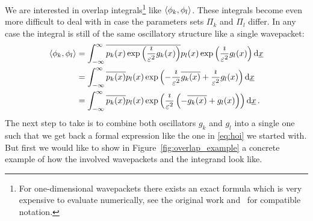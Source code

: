 \documentclass[a4paper,10pt]{article}
\begin{document}
We are interested in overlap integrals\footnote{For one-dimensional wavepackets there
exists an exact formula which is very expensive to evaluate numerically, see the original work
\cite{H_R_quantization_rules} and~\cite{B_bachelor_thesis} for compatible notation.} like
$\left\langle \phi_k , \phi_l \right\rangle$. These integrals become even more difficult to deal with in case the parameters
sets $\Pi_k$ and $\Pi_l$ differ. In any case the integral is still of the same oscillatory
structure like a single wavepacket:
\begin{equation}
\begin{split}
  \left\langle \phi_k , \phi_l \right\rangle & =
  \int_{-\infty}^{\infty} \overline{p_k(x)\exp\left(\frac{\imath}{\varepsilon^2} g_k(x)\right)}
                                p_l(x)\exp\left(\frac{\imath}{\varepsilon^2} g_l(x)\right)
  \mathrm{d}\underline{x} \\
  & =
  \int_{-\infty}^{\infty}
    \overline{p_k(x)} p_l(x)
    \exp\left(-\frac{\imath}{\varepsilon^2} \overline{g_k(x)} + \frac{\imath}{\varepsilon^2} g_l(x)\right)
  \mathrm{d}\underline{x} \\
  & =
  \int_{-\infty}^{\infty}
    \overline{p_k(x)} p_l(x)
    \exp\left(\frac{\imath}{\varepsilon^2}\left(-\overline{g_k(x)} + g_l(x)\right)\right)
  \mathrm{d}\underline{x} \,.
\end{split}
\end{equation}
The next step to take is to combine both oscillators $g_k$ and $g_l$ into a
single one such that we get back a formal expression like the one in
\eqref{eq:hoi} we started with. But first we would like to
show in Figure~\ref{fig:overlap_example} a concrete example of how the
involved wavepackets and the integrand look like.
\end{document}
